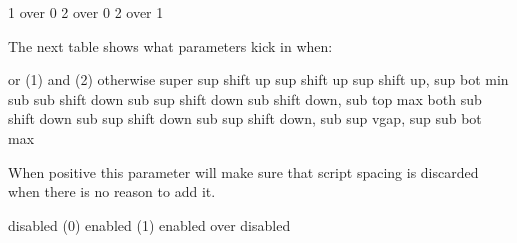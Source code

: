 \startlinecorrection
{} {}
  {\startoverlay
     {}
     {}
   \stopoverlay} {}
  {\startoverlay
     {}
     {}
   \stopoverlay} {}
  {\startoverlay
     {}
     {}
   \stopoverlay} {1 over 0}
  {\startoverlay
     {}
     {}
   \stopoverlay} {2 over 0}
  {\startoverlay
     {}
     {}
   \stopoverlay} {2 over 1}
\stopcombination
\stoplinecorrection

The next table shows what parameters kick in when:

\starttabulate[|l|l|l|p|]
\NC       \BC or (1)         \BC and (2)            \BC otherwise       \NC \NR
\BC super \NC sup shift up   \NC sup shift up       \NC sup shift up,
                                                        sup bot min     \NC \NR
\BC sub   \NC sub shift down \NC sub sup shift down \NC sub shift down,
                                                        sub top max     \NC \NR
\BC both  \NC sub shift down \NC sub sup shift down \NC sub sup shift down,
                                                        sub sup vgap,
                                                        sup sub bot max \NC \NR
\stoptabulate

\stopnewprimitive

\startnewprimitive[title={\prm {mathslackmode}}]

When positive this parameter will make sure that script spacing is discarded when
there is no reason to add it.

\startlinecorrection
{}
    {disabled (0)}
    {
     \space
     }
    {enabled (1)}
    {\startoverlay
       {     }
       { \red{}}
     \stopoverlay
     \space
     \startoverlay
       {     }
       { \red{}}
     \stopoverlay}
   {{\red enabled} over disabled}
\stopcombination
\stoplinecorrection

